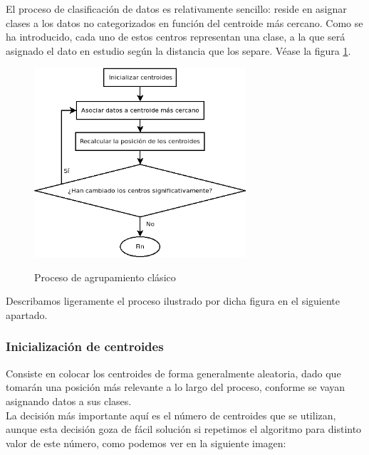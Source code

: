 \documentclass[]{report}
\begin{document}
				El proceso de clasificación de datos es relativamente sencillo: reside en asignar clases a los datos no categorizados en función del centroide más cercano. Como se ha introducido, cada uno de estos centros representan una clase, a la que será asignado el dato en estudio según la distancia que los separe. Véase la figura \ref{clustering-algorithm}.
			
				\begin{figure}[h]
					\centering
					\includegraphics[width=0.7\textwidth]{agrupamiento-clasico.png}
					\label{clustering-algorithm}
					\caption{Proceso de agrupamiento clásico}
				\end{figure}
			
				Describamos ligeramente el proceso ilustrado por dicha figura en el siguiente apartado.
				
				\subsubsection{Inicialización de centroides}
				
					Consiste en colocar los centroides de forma generalmente aleatoria, dado que tomarán una posición más relevante a lo largo del proceso, conforme se vayan asignando datos a sus clases.\\
					
					La decisión más importante aquí es el número de centroides que se utilizan, aunque esta decisión goza de fácil solución si repetimos el algoritmo para distinto valor de este número, como podemos ver en la siguiente imagen:
					
\end{document}
